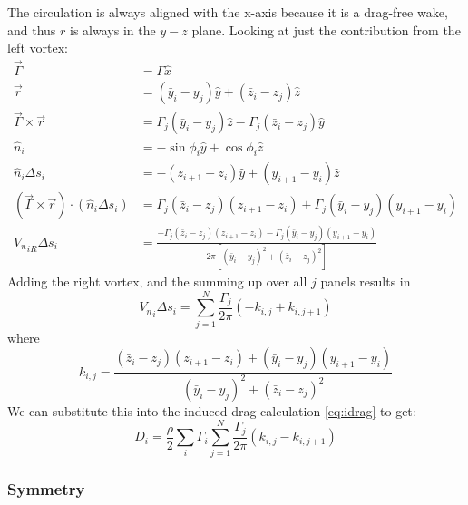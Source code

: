 \documentclass{article}
\begin{document}
The circulation is always aligned with the x-axis because it is a drag-free wake, and thus $r$ is always in the $y-z$ plane. Looking at just the contribution from the left vortex:
\begin{align}
    \vec\Gamma &= \Gamma \hat{x}\\
    \vec r &= (\bar{y}_i - y_j) \hat{y} + (\bar{z}_i - z_j) \hat{z}\\
    \vec\Gamma \times \vec{r} &= \Gamma_j (\bar{y}_i - y_j) \hat{z} - \Gamma_j (\bar{z}_i - z_j) \hat{y}\\
    \hat{n}_i &= -\sin\phi_i \hat{y} + \cos\phi_i \hat{z}\\
    \hat{n}_i \Delta s_i &= -(z_{i+1} - z_i) \hat{y} + (y_{i+1} - y_i) \hat{z}\\
    (\vec\Gamma \times \vec{r}) \cdot (\hat{n}_i \Delta s_i) &= \Gamma_j (\bar{z}_i - z_j)(z_{i+1} - z_i) + \Gamma_j (\bar{y}_i - y_j)(y_{i+1} - y_i)\\
    {V_n}_{iR} \Delta s_i &= \frac{-\Gamma_j (\bar{z}_i - z_j)(z_{i+1} - z_i) - \Gamma_j (\bar{y}_i - y_j)(y_{i+1} - y_i)}{2 \pi [(\bar{y}_i - y_j)^2 + (\bar{z}_i - z_j)^2]}
\end{align}
Adding the right vortex, and the summing up over all $j$ panels results in 
\begin{equation}
{V_n}_i \Delta s_i = \sum_{j=1}^N \frac{\Gamma_j}{2\pi} \left( -k_{i,j} + k_{i, j+1}\right)
\end{equation}
where
\begin{equation}
k_{i,j} = \frac{(\bar z_i - z_j) (z_{i+1} - z_i) + (\bar y_i - y_j) (y_{i+1} - y_i)}{(\bar y_i - y_j)^2 + (\bar z_i - z_j)^2} 
\end{equation}
We can substitute this into the induced drag calculation \cref{eq:idrag} to get:
\begin{equation}
D_i = \frac{\rho}{2} \sum_i \Gamma_i \sum_{j=1}^N \frac{\Gamma_j}{2\pi} \left( k_{i,j} - k_{i, j+1}\right)
\end{equation}


\subsubsection*{Symmetry}
\end{document}
